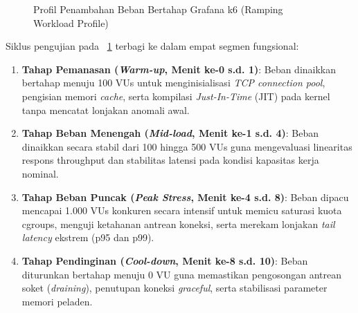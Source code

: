 \begin{figure}[H]
    \caption{Profil Penambahan Beban Bertahap Grafana k6 (Ramping Workload Profile)}
    \label{fig:profil_ramping_k6}
\end{figure}

Siklus pengujian pada \figurename\ \ref{fig:profil_ramping_k6} terbagi ke dalam empat segmen fungsional:
\begin{enumerate}
    \item \textbf{Tahap Pemanasan (\textit{Warm-up}, Menit ke-0 s.d. 1)}: Beban dinaikkan bertahap menuju 100 VUs untuk menginisialisasi \textit{TCP connection pool}, pengisian memori \textit{cache}, serta kompilasi \textit{Just-In-Time} (JIT) pada kernel tanpa mencatat lonjakan anomali awal.
    \item \textbf{Tahap Beban Menengah (\textit{Mid-load}, Menit ke-1 s.d. 4)}: Beban dinaikkan secara stabil dari 100 hingga 500 VUs guna mengevaluasi linearitas respons throughput dan stabilitas latensi pada kondisi kapasitas kerja nominal.
    \item \textbf{Tahap Beban Puncak (\textit{Peak Stress}, Menit ke-4 s.d. 8)}: Beban dipacu mencapai 1.000 VUs konkuren secara intensif untuk memicu saturasi kuota cgroups, menguji ketahanan antrean koneksi, serta merekam lonjakan \textit{tail latency} ekstrem (p95 dan p99).
    \item \textbf{Tahap Pendinginan (\textit{Cool-down}, Menit ke-8 s.d. 10)}: Beban diturunkan bertahap menuju 0 VU guna memastikan pengosongan antrean soket (\textit{draining}), penutupan koneksi \textit{graceful}, serta stabilisasi parameter memori peladen.
\end{enumerate}

